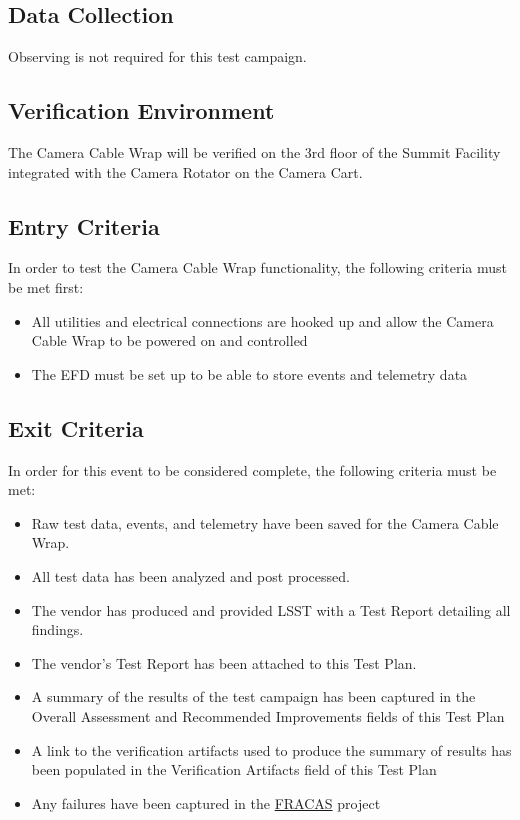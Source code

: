 \documentclass[SE,lsstdraft,STR,toc]{lsstdoc}
\providecommand{\tightlist}{
  \setlength{\itemsep}{0pt}\setlength{\parskip}{0pt}}
\begin{document}
\subsection{Data Collection}

  Observing is not required for this test campaign.

\subsection{Verification Environment}
\label{sect:hwconf}
  The Camera Cable Wrap will be verified on the 3rd floor of the Summit
Facility integrated with the Camera Rotator on the Camera Cart.

  \subsection{Entry Criteria}
  In order to test the Camera Cable Wrap functionality, the following
criteria must be met first:

\begin{itemize}
\tightlist
\item
  All utilities and electrical connections are hooked up and allow the
  Camera Cable Wrap to be powered on and controlled
\item
  The EFD must be set up to be able to store events and telemetry data
\end{itemize}

  \subsection{Exit Criteria}
  In order for this event to be considered complete, the following
criteria must be met:

\begin{itemize}
\tightlist
\item
  Raw test data, events, and telemetry have been saved for the Camera
  Cable Wrap.
\item
  All test data has been analyzed and post processed.
\item
  The vendor has produced and provided LSST with a Test Report detailing
  all findings.
\item
  The vendor's Test Report has been attached to this Test Plan.
\item
  A summary of the results of the test campaign has been captured in the
  Overall Assessment and Recommended Improvements fields of this Test
  Plan
\item
  A link to the verification artifacts used to produce the summary of
  results has been populated in the Verification Artifacts field of this
  Test Plan
\item
  Any failures have been captured in the
  \href{https://jira.lsstcorp.org/projects/FRACAS/issues/}{FRACAS}
  project
\end{itemize}
\end{document}
